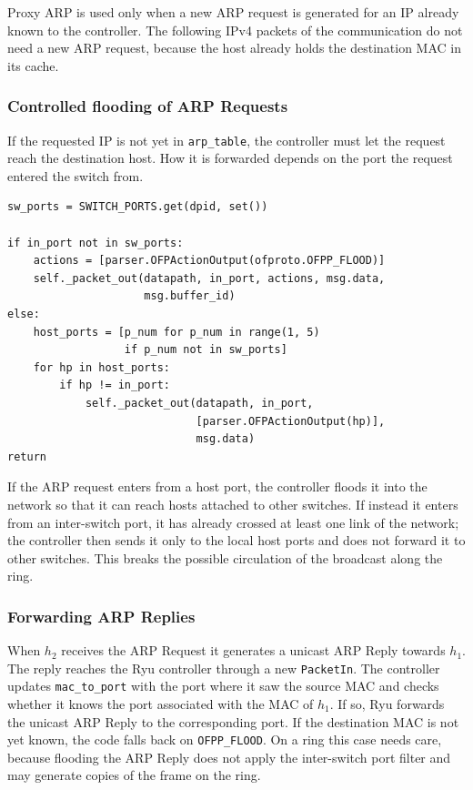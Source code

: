 \documentclass[11pt,a4paper]{article}
\newcommand{\code}[1]{\texttt{#1}}
\begin{document}
Proxy ARP is used only when a new ARP request is generated for an IP already
known to the controller. The following IPv4 packets of the communication do not
need a new ARP request, because the host already holds the destination MAC in
its cache.

\subsubsection{Controlled flooding of ARP Requests}
If the requested IP is not yet in \code{arp\_table}, the controller must let the
request reach the destination host. How it is forwarded depends on the port the
request entered the switch from.

\begin{lstlisting}[style=py,caption={Controlled ARP flooding}]
sw_ports = SWITCH_PORTS.get(dpid, set())

if in_port not in sw_ports:
    actions = [parser.OFPActionOutput(ofproto.OFPP_FLOOD)]
    self._packet_out(datapath, in_port, actions, msg.data,
                     msg.buffer_id)
else:
    host_ports = [p_num for p_num in range(1, 5)
                  if p_num not in sw_ports]
    for hp in host_ports:
        if hp != in_port:
            self._packet_out(datapath, in_port,
                             [parser.OFPActionOutput(hp)],
                             msg.data)
return
\end{lstlisting}

If the ARP request enters from a host port, the controller floods it into the
network so that it can reach hosts attached to other switches. If instead it
enters from an inter-switch port, it has already crossed at least one link of
the network; the controller then sends it only to the local host ports and does
not forward it to other switches. This breaks the possible circulation of the
broadcast along the ring.

\subsubsection{Forwarding ARP Replies}
When $h_2$ receives the ARP Request it generates a unicast ARP Reply towards
$h_1$. The reply reaches the Ryu controller through a new \code{PacketIn}. The
controller updates \code{mac\_to\_port} with the port where it saw the source MAC
and checks whether it knows the port associated with the MAC of $h_1$. If so,
Ryu forwards the unicast ARP Reply to the corresponding port. If the destination
MAC is not yet known, the code falls back on \code{OFPP\_FLOOD}. On a ring this
case needs care, because flooding the ARP Reply does not apply the inter-switch
port filter and may generate copies of the frame on the ring.
\end{document}
